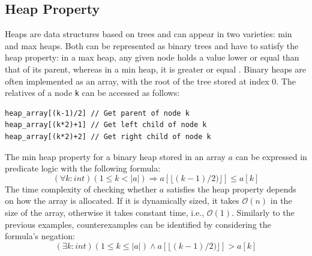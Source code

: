 \subsection{Heap Property}
Heaps \cite{dict_heap} are data structures based on trees and can appear in two varieties: min and max heaps. Both can be represented as binary trees and have to satisfy the heap property: in a max heap, any given node holds a value lower or equal than that of its parent, whereas in a min heap, it is greater or equal \cite{dict_heap_property}. Binary heaps are often implemented as an array, with the root of the tree stored at index 0. The relatives of a node \texttt{k} can be accessed as follows:
\begin{lstlisting}[language=Solidity, numbers=none, caption=Access a binary heap in array representation]
heap_array[(k-1)/2] // Get parent of node k
heap_array[(k*2)+1] // Get left child of node k
heap_array[(k*2)+2] // Get right child of node k
\end{lstlisting}
The min heap property for a binary heap stored in an array $a$ can be expressed in predicate logic with the following formula:
\begin{equation}\label{eq:heap-unversial}
  (\forall k : int) (1 \le k < |a|) \Rightarrow a[\lfloor(k-1)/2)\rfloor] \le a[k]
\end{equation}
The time complexity of checking whether $a$ satisfies the heap property depends on how the array is allocated. If it is dynamically sized, it takes $\mathcal{O}(n)$ in the size of the array, otherwise it takes constant time, i.e., $\mathcal{O}(1)$.  Similarly to the previous examples, counterexamples can be identified by considering the formula's negation:
\begin{equation}\label{eq:heap-unversial-neg}
  (\exists k : int) (1 \le k \le |a|) \land a[\lfloor(k-1)/2)\rfloor] > a[k]
\end{equation}

